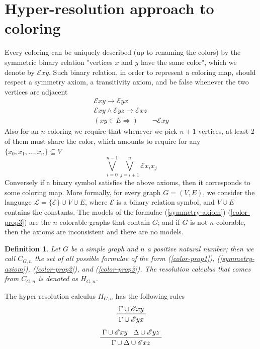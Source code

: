 \documentclass[a4paper,12pt,oneside]{book}
\newtheorem{definition}[theorem]{Definition}
\newcommand{\E}{\mathscr{E}}
\begin{document}
\section{Hyper-resolution approach to coloring}
Every coloring can be uniquely described (up to renaming the colors) by the symmetric binary relation "vertices $x$ and $y$ have the same color", which we denote by  $\E xy$. 
Such binary relation, in order to represent a coloring map, should respect a symmetry axiom, a transitivity axiom, and be false whenever the two vertices are adjacent 
\begin{gather}
\E xy \rightarrow \E yx \label{symmetry-axiom}\\
\E xy \wedge \E yz \rightarrow  \E xz \label{color-prop1}\\
( xy \in E \Rightarrow ) \qquad  \neg \E xy \label{color-prop2}
\end{gather}
Also for an $n$-coloring we require that whenever we pick $n+1$ vertices, at least 2 of them must share the color, which amounts to require for any $\{ x_0, x_1, ... , x_n \} \subseteq  V$
\begin{equation} \label{color-prop3}
\bigvee_{i=0}^{n-1} \bigvee_{j=i+1}^{n} \E x_i x_j
\end{equation}
Conversely if a binary symbol satisfies the above axioms, then it corresponds to some coloring map. More formally, for every graph $G=(V,E)$, we consider the language $\mathscr{L}=\{\E\}\cup V\cup E$, where $\E$ is a binary relation symbol, and $V\cup E$ contains the constants. The models of the formulae (\ref{symmetry-axiom})-(\ref{color-prop3}) are the $n$-colorable graphs that contain $G$; and if $G$ is not $n$-colorable, then  the axioms are inconsistent and there are no models. 
\begin{definition}
Let $G$ be a simple graph and $n$ a positive natural number; then we call $C_{G,n}$ the set of all possible formulae of the form (\ref{color-prop1}), (\ref{symmetry-axiom}), (\ref{color-prop2}), and (\ref{color-prop3}). The resolution calculus that comes from $C_{G,n}$ is denoted as $H_{G,n}$.
\end{definition}
The hyper-resolution calculus $H_{G,n}$ has the following rules
\begin{equation}
\label{symm}
\prftree{\Gamma \cup \E xy }{ \Gamma\cup \E yx }
\end{equation}
\begin{equation}
\label{trans}
 \prftree{\Gamma \cup \E xy }{\Delta \cup \E yz }{\Gamma \cup \Delta \cup \E xz }
\end{equation}
\end{document}
